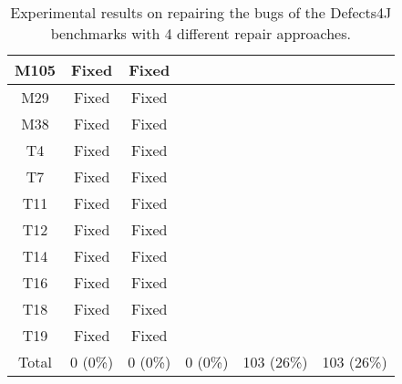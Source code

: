 \begin{table}[!t]
{\begin{tabular}{|c|c|c|c|c|c|}
M105              & Fixed     &Fixed   \\
\hline
M29               & Fixed     &Fixed   \\
M38               & Fixed     &Fixed   \\
\hline
T4                & Fixed     &Fixed   \\
T7                & Fixed     &Fixed   \\
T11               & Fixed     &Fixed   \\
T12               & Fixed     &Fixed   \\
T14               & Fixed     &Fixed   \\
T16               & Fixed     &Fixed   \\
T18               & Fixed     &Fixed   \\
T19               & Fixed     &Fixed   \\
\hline
Total             & 0 (0\%)   & 0 (0\%)   & 0 (0\%)   & 103 (26\%) & 103 (26\%)\\
\hline 
\end{tabular}%
}
\caption{Experimental results on repairing the bugs of the Defects4J benchmarks with 4 different repair approaches.}
\end{table}
